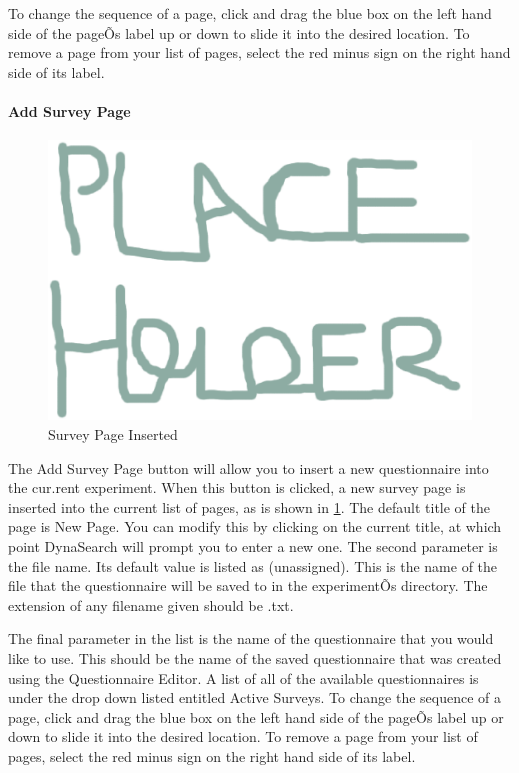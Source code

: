 \documentclass[article]{ij4uq}              %
\begin{document}
To change the sequence of a page, click and drag the blue box on the left hand side of the pageÕs label up or down to slide it into the desired location. To remove a page from your list of pages, select the red minus sign on the right hand side of its label.

\paragraph{Add Survey Page}

\begin{figure}[h!]
 \centering
 \includegraphics[width=5.0in]{figures/place.eps}
 \caption{Survey Page Inserted}
 \label{fig:surveyInsert}
\end{figure}
\FloatBarrier

The Add Survey Page button will allow you to insert a new questionnaire into the cur.rent experiment. When this button is clicked, a new survey page is inserted into the current list of pages, as is shown in \ref{fig:surveyInsert}. The default title of the page is New Page. You can modify this by clicking on the current title, at which point DynaSearch will prompt you to enter a new one. The second parameter is the file name. Its default value is listed as (unassigned). This is the name of the file that the questionnaire will be saved to in the experimentÕs directory. The extension of any filename given should be .txt.

The final parameter in the list is the name of the questionnaire that you would like to use. This should be the name of the saved questionnaire that was created using the Questionnaire Editor. A list of all of the available questionnaires is under the drop down listed entitled Active Surveys. 
To change the sequence of a page, click and drag the blue box on the left hand side of the pageÕs label up or down to slide it into the desired location. To remove a page from your list of pages, select the red minus sign on the right hand side of its label.
\end{document}
